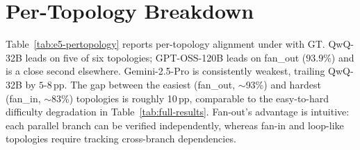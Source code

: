 \section{Per-Topology Breakdown}
\label{app:pertopology-table}

Table~\ref{tab:e5-pertopology} reports per-topology alignment under
with GT. QwQ-32B leads on five of six topologies; GPT-OSS-120B leads on
fan\_out ($93.9\%$) and is a close second elsewhere. Gemini-2.5-Pro is
consistently weakest, trailing QwQ-32B by $5$-$8$\,pp. The gap between
the easiest (fan\_out, $\sim$93\%) and hardest (fan\_in, $\sim$83\%)
topologies is roughly 10\,pp, comparable to the easy-to-hard difficulty
degradation in Table~\ref{tab:full-results}. Fan-out's advantage is
intuitive: each parallel branch can be verified independently, whereas
fan-in and loop-like topologies require tracking cross-branch dependencies.

\begin{table}[!htbp]
\centering
\small
\setlength{\tabcolsep}{4pt}
\renewcommand{\arraystretch}{1.05}
\caption{Judge alignment (with GT, \%) by DAG topology. Bold marks the
best judge per topology.}
\label{tab:e5-pertopology}

\end{table}


